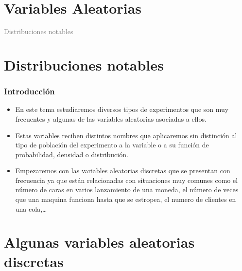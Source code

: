 \documentclass[handout]{beamer}\usepackage[]{graphicx}\usepackage[]{color}
\title[\red{Matemáticas III GINF}]{}
\author[]{R. Alberich}
\date{}
\newcommand{\gray}[1]{\textcolor{gray}{#1}}
\theoremstyle{plain}
\theoremstyle{definition}
\begin{document}
\beamertemplatedotitem

\lstset{breaklines=true}
\lstset{basicstyle=\ttfamily}


\section{Variables Aleatorias}

\begin{frame}
\vfill
\begin{center}
\gray{\LARGE Distribuciones notables}
\end{center}
\vfill
\end{frame}
\section{Distribuciones notables}

\begin{frame}
\frametitle{Introducción}
\begin{itemize}
\item En este tema estudiaremos diversos tipos de experimentos que son muy frecuentes y algunas de las variables aleatorias asociadas a ellos. 

\item Estas variables reciben distintos nombres
que aplicaremos sin distinción al tipo de población del experimento a la variable o a su
función de probabilidad, densidad o distribución.
\item Empezaremos con las variables aleatorias discretas que se presentan con frecuencia ya que están
relacionadas con situaciones muy comunes como el número de caras en varios lanzamiento de
una moneda, el número de veces que una maquina funciona hasta que se estropea, el numero de
clientes en una cola,\ldots
\end{itemize}

\end{frame}

\section{Algunas variables aleatorias discretas}
\end{document}
